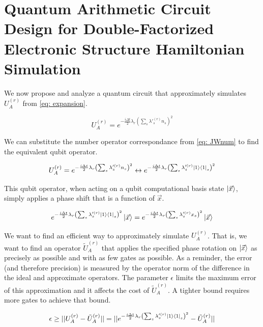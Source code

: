 

\chapter{Quantum Arithmetic Circuit Design for Double-Factorized Electronic Structure Hamiltonian Simulation}

We now propose and analyze a quantum circuit that approximately simulates $U_A^{(r)}$ from \eqref{eq: expansion}.

\begin{equation}
    U_A^{(r)} = e^{-\frac{i\Delta t}{2}\lambda_r\left(\sum_s \lambda'^{(r)}_s n_s\right)^2} \label{eq: U_A}
\end{equation}

We can substitute the number operator correspondance from \eqref{eq: JWnum} to find the equivalent qubit operator.

\begin{equation}
    U_A^{(r)} = e^{-\frac{i\Delta t}{2}\lambda_r\left(\sum_s \lambda'^{(r)}_s n_s\right)^2} \leftrightarrow e^{-\frac{i\Delta t}{2}\lambda_r\left(\sum_s \lambda'^{(r)}_s \ket{1}\bra{1}_s\right)^2}
\end{equation}

This qubit operator, when acting on a qubit computational basis state $\ket{\vec{x}}$, simply applies a phase shift that is a function of $\vec{x}$.

\begin{equation}
    e^{-\frac{i\Delta t}{2}\lambda_r\left(\sum_s \lambda'^{(r)}_s \ket{1}\bra{1}_s\right)^2}\ket{\vec{x}} = e^{-\frac{i\Delta t}{2}\lambda_r\left(\sum_s \lambda'^{(r)}_s x_s\right)^2}\ket{\vec{x}}
\end{equation}

We want to find an efficient way to approximately simulate $U_A^{(r)}$. That is, we want to find an operator $\tilde{U}_A^{(r)}$ that applies the specified phase rotation on $\ket{\vec{x}}$ as precisely as possible and with as few gates as possible. As a reminder, the error (and therefore precision) is measured by the operator norm of the difference in the ideal and approximate operators. The parameter $\epsilon$ limits the maximum error of this approximation and it affects the cost of $\tilde{U}_A^{(r)}$. A tighter bound requires more gates to achieve that bound.

\begin{equation}
    \epsilon \geq ||U_A^{(r)} - \tilde{U}_A^{(r)}|| = ||e^{-\frac{i\Delta t}{2}\lambda_r\left(\sum_s \lambda'^{(r)}_s \ket{1}\bra{1}_s\right)^2} - \tilde{U}_A^{(r)}|| \label{eq: error}
\end{equation}

